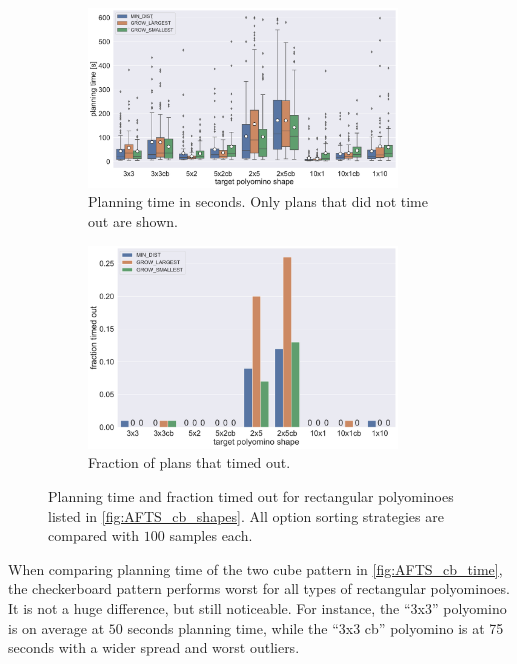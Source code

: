 \begin{figure}
	\centering
	\begin{subfigure}[b]{\textwidth}
		\centering
		\includegraphics[width=0.9\textwidth]{figures/plots/AFTS_cb_time.pdf}
		\caption{Planning time in seconds. Only plans that did not time out are shown.}
		\label{fig:AFTS_cb_time}
	\end{subfigure}
	
	\begin{subfigure}[b]{\textwidth}
		\centering
		\includegraphics[width=0.9\textwidth]{figures/plots/AFTS_cb_timeout.pdf}
		\caption{Fraction of plans that timed out.}
		\label{fig:AFTS_cb_timeout}
	\end{subfigure}
	\caption[Planning time and fraction timed out for rectangular polyominoes]{Planning time and fraction timed out for rectangular polyominoes listed in \autoref{fig:AFTS_cb_shapes}. All option sorting strategies are compared with $100$ samples each.}
	\label{fig:AFTS_cb_timestats}
\end{figure}

When comparing planning time of the two cube pattern in \autoref{fig:AFTS_cb_time}, the checkerboard pattern performs worst for all types of rectangular polyominoes.
It is not a huge difference, but still noticeable.
For instance, the ``3x3'' polyomino is on average at $50$ seconds planning time, while the ``3x3 cb'' polyomino is at 75 seconds with a wider spread and worst outliers.

